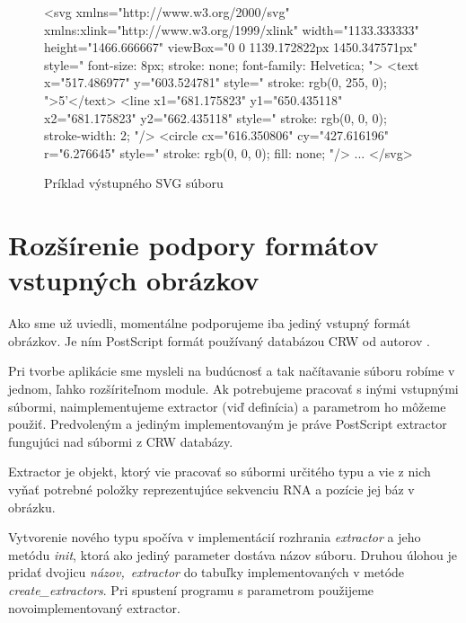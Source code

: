 \begin{figure}
\begin{code}[fontsize=\scriptsize, frame=none, samepage=true]
<svg xmlns="http://www.w3.org/2000/svg" xmlns:xlink="http://www.w3.org/1999/xlink"
  width="1133.333333" height="1466.666667" viewBox="0 0 1139.172822px 1450.347571px"
  style="
    font-size: 8px; 
    stroke: none; 
    font-family: Helvetica; ">
  <text 
    x="517.486977"
    y="603.524781"
    style="
      stroke: rgb(0, 255, 0); ">5'</text>
  <line 
    x1="681.175823"
    y1="650.435118" 
    x2="681.175823"
    y2="662.435118"
    style="
      stroke: rgb(0, 0, 0); 
      stroke-width: 2; "/>
  <circle 
    cx="616.350806"
    cy="427.616196"
    r="6.276645"
    style="
      stroke: rgb(0, 0, 0); 
      fill: none; "/>
  ...
</svg>
\end{code}
\caption{Príklad výstupného SVG súboru}
\label{obr:svg_out}
\end{figure}





\section{Rozšírenie podpory formátov vstupných obrázkov}
\label{kap:rozsirenie}

Ako sme už uviedli, momentálne podporujeme iba jediný vstupný formát obrázkov.
Je ním PostScript formát používaný databázou CRW od autorov \citet{CRW}.

Pri tvorbe aplikácie sme mysleli na budúcnosť a tak načítavanie súboru
robíme v jednom, ľahko rozšíriteľnom module.
Ak potrebujeme pracovať s inými vstupnými súbormi, naimplementujeme extractor
(viď definícia) a parametrom  ho môžeme použiť.
Predvoleným a jediným implementovaným je práve PostScript extractor
fungujúci nad súbormi z CRW databázy.

\begin{definice}
  Extractor je objekt, ktorý vie pracovať so súbormi určitého typu
  a vie z nich vyňať potrebné položky reprezentujúce sekvenciu RNA
  a pozície jej báz v obrázku.
\end{definice}

\renewcommand{\tagt}[1]{\mbox{\textit{#1}}}

Vytvorenie nového typu spočíva v implementácií rozhrania \tagt{extractor}
a jeho metódu \tagt{init}, ktorá ako jediný parameter dostáva názov súboru.
Druhou úlohou je pridať dvojicu \tagt{názov, extractor} do tabuľky
implementovaných v metóde \tagt{create\_extractors}.
Pri spustení programu s parametrom  použijeme
novoimplementovaný extractor.


